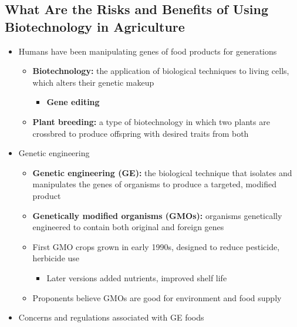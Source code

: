 \documentclass[12pt]{article}
\begin{document}
        \subsection{What Are the Risks and Benefits of Using Biotechnology in Agriculture}
            \begin{itemize}
                \item Humans have been manipulating genes of food products for generations
                    \begin{itemize}
                        \item \textbf{Biotechnology:} the application of biological techniques to living cells, which alters their genetic makeup
                            \begin{itemize}
                                \item \textbf{Gene editing}
                            \end{itemize}
                        \item \textbf{Plant breeding:} a type of biotechnology in which two plants are crossbred to produce offspring with desired traits from both
                    \end{itemize}
                \item Genetic engineering
                    \begin{itemize}
                        \item \textbf{Genetic engineering (GE):} the biological technique that isolates and manipulates the genes of organisms to produce a targeted, modified product
                        \item \textbf{Genetically modified organisms (GMOs):} organisms genetically engineered to contain both original and foreign genes
                        \item First GMO crops grown in early 1990s, designed to reduce pesticide, herbicide use
                            \begin{itemize}
                                \item Later versions added nutrients, improved shelf life
                            \end{itemize}
                        \item Proponents believe GMOs are good for environment and food supply
                    \end{itemize}
                \item Concerns and regulations associated with GE foods

\end{itemize}
\end{document}
